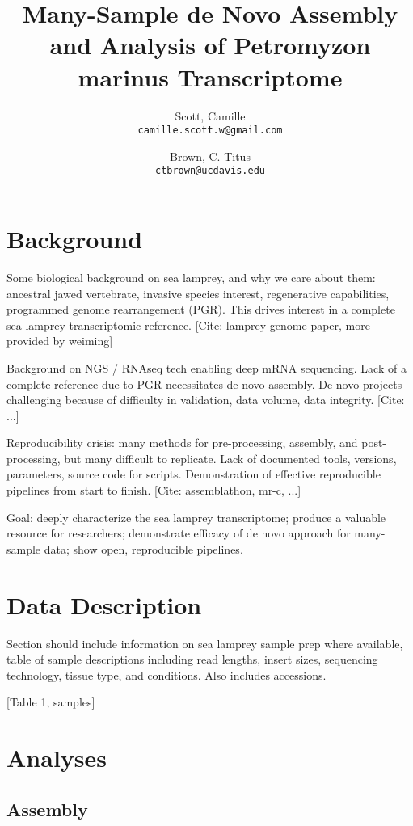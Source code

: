 \documentclass{article}
\title{Many-Sample de Novo Assembly and Analysis of Petromyzon marinus Transcriptome}
\author{
    Scott, Camille\\
    \texttt{camille.scott.w@gmail.com}   %
    \and
    Brown, C. Titus\\
    \texttt{ctbrown@ucdavis.edu}
}
\begin{document}
\maketitle

\section*{Background}

Some biological background on sea lamprey, and why we care about them: ancestral jawed vertebrate, invasive species interest, regenerative capabilities, programmed genome rearrangement (PGR). This drives interest in a complete sea lamprey transcriptomic reference. [Cite: lamprey genome paper, more provided by weiming]

Background on NGS / RNAseq tech enabling deep mRNA sequencing. Lack of a complete reference due to PGR necessitates de novo assembly. De novo projects challenging because of difficulty in validation, data volume, data integrity. [Cite: ...]

Reproducibility crisis: many methods for pre-processing, assembly, and post-processing, but many difficult to replicate. Lack of documented tools, versions, parameters, source code for scripts. Demonstration of effective reproducible pipelines from start to finish. [Cite: assemblathon, mr-c, ...]

Goal: deeply characterize the sea lamprey transcriptome; produce a valuable resource for researchers; demonstrate efficacy of de novo approach for many-sample data; show open, reproducible pipelines.

\section*{Data Description}

Section should include information on sea lamprey sample prep where available, table of sample descriptions including read lengths, insert sizes, sequencing technology, tissue type, and conditions. Also includes accessions.

[Table 1, samples]

\section*{Analyses}

\subsection*{Assembly}
\end{document}

